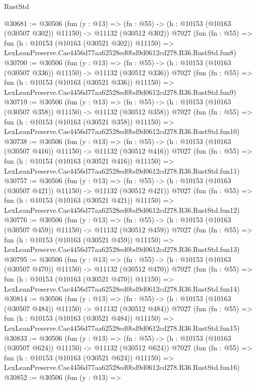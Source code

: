 \begin{lexlean}{RustStd}
\begin{coremodule}
@30681 := @30506
    (fun (y : @13) =>
    (fn : @55) -> (h : @10153 (@10163 (@30507 @302)) @11150) -> @11132 (@30512 @302))
    @7027
    (fun (fn : @55) =>
    fun (h : @10153 (@10163 (@30521 @302)) @11150) =>
    LexLeanPreserve.Cae4456d77aa62528ed0bd9d0612cd278.R36.RustStd.fun8)
@30700 := @30506
    (fun (y : @13) =>
    (fn : @55) -> (h : @10153 (@10163 (@30507 @336)) @11150) -> @11132 (@30512 @336))
    @7027
    (fun (fn : @55) =>
    fun (h : @10153 (@10163 (@30521 @336)) @11150) =>
    LexLeanPreserve.Cae4456d77aa62528ed0bd9d0612cd278.R36.RustStd.fun9)
@30719 := @30506
    (fun (y : @13) =>
    (fn : @55) -> (h : @10153 (@10163 (@30507 @358)) @11150) -> @11132 (@30512 @358))
    @7027
    (fun (fn : @55) =>
    fun (h : @10153 (@10163 (@30521 @358)) @11150) =>
    LexLeanPreserve.Cae4456d77aa62528ed0bd9d0612cd278.R36.RustStd.fun10)
@30738 := @30506
    (fun (y : @13) =>
    (fn : @55) -> (h : @10153 (@10163 (@30507 @416)) @11150) -> @11132 (@30512 @416))
    @7027
    (fun (fn : @55) =>
    fun (h : @10153 (@10163 (@30521 @416)) @11150) =>
    LexLeanPreserve.Cae4456d77aa62528ed0bd9d0612cd278.R36.RustStd.fun11)
@30757 := @30506
    (fun (y : @13) =>
    (fn : @55) -> (h : @10153 (@10163 (@30507 @421)) @11150) -> @11132 (@30512 @421))
    @7027
    (fun (fn : @55) =>
    fun (h : @10153 (@10163 (@30521 @421)) @11150) =>
    LexLeanPreserve.Cae4456d77aa62528ed0bd9d0612cd278.R36.RustStd.fun12)
@30776 := @30506
    (fun (y : @13) =>
    (fn : @55) -> (h : @10153 (@10163 (@30507 @459)) @11150) -> @11132 (@30512 @459))
    @7027
    (fun (fn : @55) =>
    fun (h : @10153 (@10163 (@30521 @459)) @11150) =>
    LexLeanPreserve.Cae4456d77aa62528ed0bd9d0612cd278.R36.RustStd.fun13)
@30795 := @30506
    (fun (y : @13) =>
    (fn : @55) -> (h : @10153 (@10163 (@30507 @470)) @11150) -> @11132 (@30512 @470))
    @7027
    (fun (fn : @55) =>
    fun (h : @10153 (@10163 (@30521 @470)) @11150) =>
    LexLeanPreserve.Cae4456d77aa62528ed0bd9d0612cd278.R36.RustStd.fun14)
@30814 := @30506
    (fun (y : @13) =>
    (fn : @55) -> (h : @10153 (@10163 (@30507 @484)) @11150) -> @11132 (@30512 @484))
    @7027
    (fun (fn : @55) =>
    fun (h : @10153 (@10163 (@30521 @484)) @11150) =>
    LexLeanPreserve.Cae4456d77aa62528ed0bd9d0612cd278.R36.RustStd.fun15)
@30833 := @30506
    (fun (y : @13) =>
    (fn : @55) -> (h : @10153 (@10163 (@30507 @624)) @11150) -> @11132 (@30512 @624))
    @7027
    (fun (fn : @55) =>
    fun (h : @10153 (@10163 (@30521 @624)) @11150) =>
    LexLeanPreserve.Cae4456d77aa62528ed0bd9d0612cd278.R36.RustStd.fun16)
@30852 := @30506
    (fun (y : @13) =>

\end{coremodule}
\end{lexlean}
